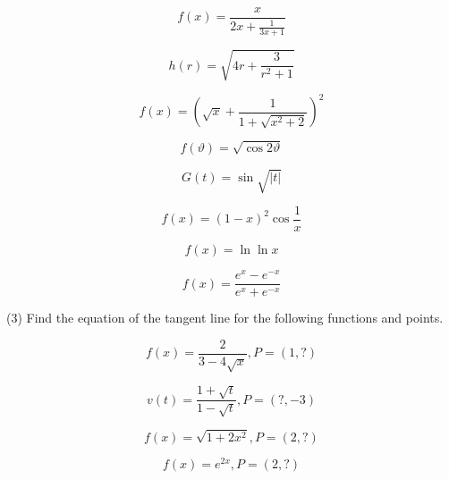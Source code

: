 \documentclass[11pt]{article}
\begin{document}
\begin{equation}
  \label{eq:feivooch}
  f(x)=\frac{x}{2x+\frac{1}{3x+1}}
\end{equation}

\begin{equation}
  \label{eq:feeraiva}
  h(r)=\sqrt{4r+\frac{3}{r^{2}+1}}
\end{equation}

\begin{equation}
  \label{eq:siebaish}
  f(x)=\left(\sqrt{x}+\frac{1}{1+\sqrt{x^{2}+2}}\right)^{2}
\end{equation}

\begin{equation}
  \label{eq:feiveloh}
  f(\vartheta)=\sqrt{\cos{}2\vartheta}
\end{equation}

\begin{equation}
  \label{eq:oifahtie}
  G(t)=\sin\sqrt{\vert{}t\vert}
\end{equation}

\begin{equation}
  \label{eq:isaithar}
  f(x)=(1-x)^{2}\cos\frac{1}{x}
\end{equation}

\begin{equation}
  \label{eq:ixoathat}
  f(x)=\ln\ln{}x
\end{equation}

\begin{equation}
  \label{eq:airougof}
  f(x)=\frac{e^{x}-e^{-x}}{e^{x}+e^{-x}}
\end{equation}

(3) Find the equation of the tangent line for the following functions
and points.

\begin{equation}
  \label{eq:fiedaghe}
  f(x)=\frac{2}{3-4\sqrt{x}}, P=(1,?)
\end{equation}

\begin{equation}
  \label{eq:oozeewai}
  v(t)=\frac{1+\sqrt{t}}{1-\sqrt{t}}, P=(?,-3)
\end{equation}

\begin{equation}
  \label{eq:heijeivo}
  f(x)=\sqrt{1+2x^{2}}, P=(2,?)
\end{equation}

\begin{equation}
  \label{eq:jeimouti}
  f(x)=e^{2x}, P=(2,?)
\end{equation}
\end{document}
